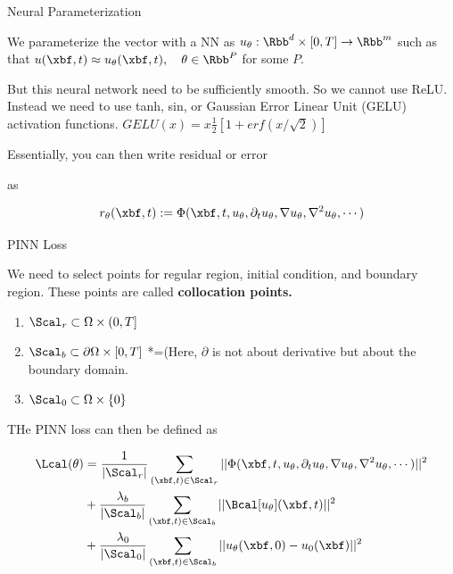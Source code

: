 \documentclass[aspectratio=169,xcolor=dvipsnames,svgnames,x11names,fleqn]{beamer}
\begin{document}
\begin{frame}{Neural Parameterization}

We parameterize the vector with a NN as $u_\theta: \Rbb^d \times [0, T] \to \Rbb^m$ such as that $u(\xbf, t) \approx u_\theta(\xbf, t), \quad \theta \in \Rbb^P$ for some $P$.

\vspace{10pt}

But this neural network need to be sufficiently smooth. So we cannot use ReLU. Instead we need to use tanh, sin, or Gaussian Error Linear Unit (GELU) activation functions. $GELU(x)= x\tfrac{1}{2}[1 + erf(x/\sqrt{2})]$

Essentially, you can then write residual or error 

as

\begin{align*}
r_\theta(\xbf, t) :=  \Phi(\xbf, t, u_\theta, \partial_t u_\theta, \nabla u_\theta, \nabla^2 u_\theta, \cdots) 
\end{align*}
\end{frame}

\begin{frame}{PINN Loss}

\footnotesize

We need to select points for regular region, initial condition, and boundary region. These points are called \textbf{collocation points.}

\begin{enumerate}
\item $\Scal_r \subset \Omega \times (0, T]$
\item $\Scal_b \subset \partial\Omega \times [0, T]$ *=(Here, $ \partial$ is not about derivative but about the boundary domain.
\item $\Scal_0 \subset \Omega \times \{ 0\}$
\end{enumerate}

THe PINN loss can then be defined as 


\begin{tcolorbox}[    enhanced,
    colback=softMint,
    colframe=borderLine,
    sharp corners,
    arc=0pt, 
    boxrule=0.4pt,
    leftrule=3pt,
    borderline west={5pt}{0pt}{highlightOrange}, 
    fontupper=\color{boxBackground},
    pad at break*=0mm,
    top=1pt, bottom=2pt, left=5pt, right=5pt]
    
    \begin{align*}
    \Lcal(\theta) & = \frac{1}{|\Scal_r|} \sum_{(\xbf, t) \in \Scal_r} ||\Phi(\xbf, t, u_\theta, \partial_t u_\theta, \nabla u_\theta, \nabla^2 u_\theta, \cdots) ||^2 \\
   & + 
    \frac{\lambda_b}{|\Scal_b|} \sum_{(\xbf, t) \in \Scal_b} || \Bcal[u_\theta](\xbf, t)||^2 \\
   & + \frac{\lambda_0}{|\Scal_0|} \sum_{(\xbf, t) \in \Scal_b} ||  u_\theta(\xbf, 0) - u_0(\xbf)||^2 
    \end{align*}
    
    \end{tcolorbox}
    
\end{frame}
\end{document}
